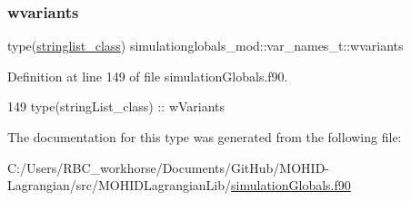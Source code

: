 \subsubsection{\texorpdfstring{wvariants}{wvariants}}
{\footnotesize\ttfamily type(\mbox{\hyperlink{structsimulationglobals__mod_1_1stringlist__class}{stringlist\+\_\+class}}) simulationglobals\+\_\+mod\+::var\+\_\+names\+\_\+t\+::wvariants\hspace{0.3cm}{\ttfamily [private]}}



Definition at line 149 of file simulation\+Globals.\+f90.


\begin{DoxyCode}
149         \textcolor{keywordtype}{type}(stringList\_class) :: wVariants
\end{DoxyCode}


The documentation for this type was generated from the following file\+:\begin{DoxyCompactItemize}
\item 
C\+:/\+Users/\+R\+B\+C\+\_\+workhorse/\+Documents/\+Git\+Hub/\+M\+O\+H\+I\+D-\/\+Lagrangian/src/\+M\+O\+H\+I\+D\+Lagrangian\+Lib/\mbox{\hyperlink{simulation_globals_8f90}{simulation\+Globals.\+f90}}\end{DoxyCompactItemize}
